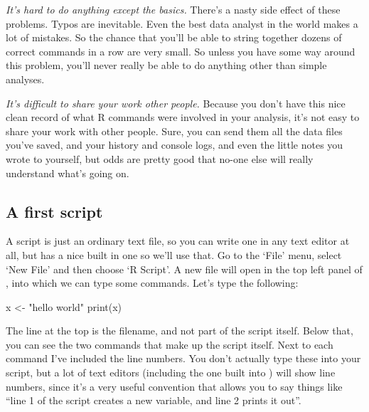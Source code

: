 {	\item \textit{It's hard to do anything except the basics.} There's a nasty side effect of these problems. Typos are inevitable. Even the best data analyst in the world makes a lot of mistakes. So the chance that you'll be able to string together dozens of correct \R commands in a row are very small. So unless you have some way around this problem, you'll never really be able to do anything other than simple analyses.

	\item \textit{It's difficult to share your work other people.} Because you don't have this nice clean record of what R commands were involved in your analysis, it's not easy to share your work with other people. Sure, you can send them all the data files you've saved, and your history and console logs, and even the little notes you wrote to yourself, but odds are pretty good that no-one else will really understand what's going on.
}




\subsection{A first script}

A script is just an ordinary text file, so you can write one in any text editor at all, but \Rstudio has a nice built in one so we’ll use that. Go to the `File' menu, select `New File' and then choose `R Script'. A new file will open in the top left panel of \Rstudio, into which we can type some commands. Let's type the following:

\begin{script}
	x <- "hello world"
	print(x)
\end{script}
The line at the top is the filename, and not part of the script itself. Below that, you can see the two \R commands that make up the script itself. Next to each command I've included the line numbers. You don't actually type these into your script, but a lot of text editors (including the one built into \Rstudio) will show line numbers, since it's a very useful convention that allows you to say things like ``line 1 of the script creates a new variable, and line 2 prints it out''. 

